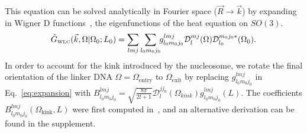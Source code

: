 \documentclass[%
 reprint,
superscriptaddress,
showpacs,preprintnumbers,
 amsmath,amssymb,
 aps,
 prl,
]{revtex4-1}
\newcommand{\ghat}[2][\Omega_0; L_0]{\hat{G}_\text{\tiny WLC}(#2|#1)}
\newcommand{\wigD}{\mathcal{D}}
\begin{document}
This equation can be solved analytically in Fourier space
    ($\vec{R} \rightarrow \vec{k}$) by expanding in Wigner D
    functions~\cite{spakowitz2006}, the eigenfunctions of the heat equation on
    $SO(3)$.
\begin{equation}\label{eq:expansion}
    \ghat{\vec{k}, \Omega} = \sum_{l m j}\sum_{l_0 m_0 j_0} \!\! g_{l_0 m_0 j_0}^{lmj}
        \wigD_l^{mj}(\Omega)\wigD_{l_0}^{m_0 j_0 *}(\Omega_0).
\end{equation}
In order to account for the kink introduced by the nucleosome, we rotate
    the final orientation of the linker DNA ${\Omega = \Omega_\text{entry}}$ to
    $\Omega_\text{exit}$ by replacing %
    $g_{l_0 m_0 j_0}^{lmj}$ in Eq.~\ref{eq:expansion} with $B_{l_{0}m_{0}j_{0}}^{lmj} =
    \sqrt{\frac{8\pi}{2l+1}} \mathcal{D}_{l}^{jj_{0}}
    \left(\Omega_{kink}\right)g_{l_{0}m_{0}j_{0}}^{lmj}\left(L\right)$.
The coefficients $B_{l_0 m_0 j_0}^{lmj}(\Omega_\text{kink}, L)$ were first computed
    in~\cite{zhou2003}, and an alternative derivation can be found in the supplement.
\end{document}
